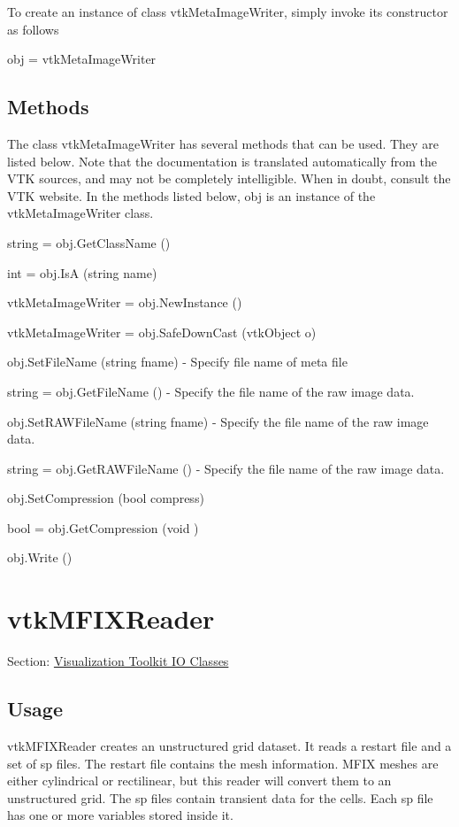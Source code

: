 To create an instance of class vtk\-Meta\-Image\-Writer, simply invoke its constructor as follows \begin{DoxyVerb}  obj = vtkMetaImageWriter
\end{DoxyVerb}
 \hypertarget{vtkwidgets_vtkxyplotwidget_Methods}{}\subsection{Methods}\label{vtkwidgets_vtkxyplotwidget_Methods}
The class vtk\-Meta\-Image\-Writer has several methods that can be used. They are listed below. Note that the documentation is translated automatically from the V\-T\-K sources, and may not be completely intelligible. When in doubt, consult the V\-T\-K website. In the methods listed below, {\ttfamily obj} is an instance of the vtk\-Meta\-Image\-Writer class. 
\begin{DoxyItemize}
\item {\ttfamily string = obj.\-Get\-Class\-Name ()}  
\item {\ttfamily int = obj.\-Is\-A (string name)}  
\item {\ttfamily vtk\-Meta\-Image\-Writer = obj.\-New\-Instance ()}  
\item {\ttfamily vtk\-Meta\-Image\-Writer = obj.\-Safe\-Down\-Cast (vtk\-Object o)}  
\item {\ttfamily obj.\-Set\-File\-Name (string fname)} -\/ Specify file name of meta file  
\item {\ttfamily string = obj.\-Get\-File\-Name ()} -\/ Specify the file name of the raw image data.  
\item {\ttfamily obj.\-Set\-R\-A\-W\-File\-Name (string fname)} -\/ Specify the file name of the raw image data.  
\item {\ttfamily string = obj.\-Get\-R\-A\-W\-File\-Name ()} -\/ Specify the file name of the raw image data.  
\item {\ttfamily obj.\-Set\-Compression (bool compress)}  
\item {\ttfamily bool = obj.\-Get\-Compression (void )}  
\item {\ttfamily obj.\-Write ()}  
\end{DoxyItemize}\hypertarget{vtkio_vtkmfixreader}{}\section{vtk\-M\-F\-I\-X\-Reader}\label{vtkio_vtkmfixreader}
Section\-: \hyperlink{sec_vtkio}{Visualization Toolkit I\-O Classes} \hypertarget{vtkwidgets_vtkxyplotwidget_Usage}{}\subsection{Usage}\label{vtkwidgets_vtkxyplotwidget_Usage}
vtk\-M\-F\-I\-X\-Reader creates an unstructured grid dataset. It reads a restart file and a set of sp files. The restart file contains the mesh information. M\-F\-I\-X meshes are either cylindrical or rectilinear, but this reader will convert them to an unstructured grid. The sp files contain transient data for the cells. Each sp file has one or more variables stored inside it.

